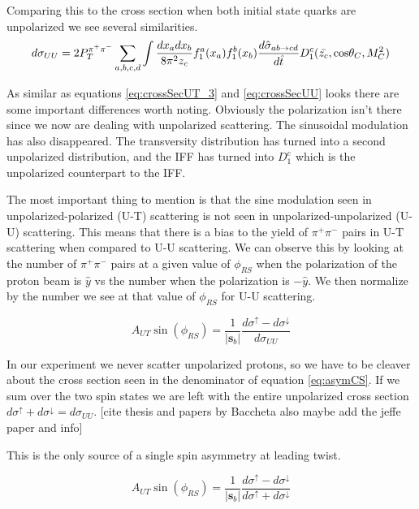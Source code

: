 \documentclass[abstract = on,listof=totoc, bibliography=totoc]{scrreprt}
\newcommand{\phirs}{\phi_{RS}}
\newcommand{\ptpair}{P_{T}^{\pi^+\pi^-}}
\newcommand{\pip}{\pi^+}
\newcommand{\pim}{\pi^-}
\newcommand{\pair}{$\pip\pim$ }
\begin{document}
Comparing this to the cross section when both initial state quarks are unpolarized we see several similarities.
\begin{equation}
\label{eq:crossSecUU}
d\sigma_{UU} = 2 \ptpair \sum_{a,b,c,d} \int \frac{dx_adx_b}{8\pi^2z_c} f_1^a(x_a)f_1^b(x_b) \frac{d\hat{\sigma}_{ab \rightarrow cd}}{d\hat{t}}D_1^c(\bar{z_c},\textnormal{cos}\theta_C,M_C^2)
\end{equation}

As similar as equations \ref{eq:crossSecUT_3} and \ref{eq:crossSecUU} looks there are some important differences worth noting. Obviously the polarization isn't there since we now are dealing with unpolarized scattering. The sinusoidal modulation has also disappeared. The transversity distribution has turned into a second unpolarized distribution, and the IFF has turned into $D_1^c$ which is the unpolarized counterpart to the IFF.   

The most important thing to mention is that the sine modulation seen in unpolarized-polarized (U-T) scattering is not seen in unpolarized-unpolarized (U-U) scattering. This means that there is a bias to the yield of \pair pairs in U-T scattering when compared to U-U scattering. We can observe this by looking at the number of \pair pairs at a given value of $\phirs$ when the polarization of the proton beam is $\hat{y}$ vs the number when the polarization is $-\hat{y}$. We then normalize by the number we see at that value of $\phirs$ for U-U scattering. 

\begin{equation}
\label{eq:asymCS}
A_{UT} \sin (\phirs) =\frac{1}{|\bm{s}_b|} \frac{d\sigma^\uparrow - d\sigma^\downarrow}{d\sigma_{UU}}
\end{equation}

In our experiment we never scatter unpolarized protons, so we have to be cleaver about the cross section seen in the denominator of equation \ref{eq:asymCS}. If we sum over the two spin states we are left with the entire unpolarized cross section $d\sigma^\uparrow + d\sigma^\downarrow = d\sigma_{UU}$. [cite thesis and papers by Baccheta also maybe add the jeffe paper and info] 

This is the only source of a single spin asymmetry at leading twist.\cite{bacchettaRedici2}

\begin{equation}
\label{eq:asymCS}
A_{UT} \sin (\phirs) =\frac{1}{|\bm{s}_b|} \frac{d\sigma^\uparrow - d\sigma^\downarrow}{d\sigma^\uparrow + d\sigma^\downarrow}
\end{equation}
\end{document}
